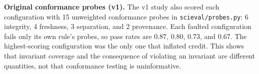 \textbf{Original conformance probes (v1).} The v1 study also scored each
configuration with 15 unweighted conformance probes in
\texttt{scieval/probes.py}: 6 integrity, 4 freshness, 3 separation, and 2
provenance. Each faulted configuration fails only its own rule's probes, so
pass rates are  0.87,  0.80,  0.73, and
 0.67. The highest-scoring configuration was the only one that
inflated credit. This shows that invariant coverage and the consequence of
violating an invariant are different quantities, not that conformance
testing is uninformative.
